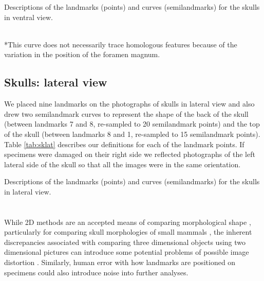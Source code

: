 \documentclass[12pt,a4paper]{article}
\begin{document}
\begin{table}[!htb] 
\caption[Skulls: ventral landmarks]
		{Descriptions of the landmarks (points) and curves (semilandmarks) for the skulls in ventral view.} 

\label{tab:skvent}
\\
*This curve does not necessarily trace homologous features because of the variation in the position of the foramen magnum.
\end{table}
	
\newpage
\subsection{Skulls: lateral view}
	We placed nine landmarks on the photographs of skulls in lateral view and also drew two semilandmark curves to represent the shape of the back of the skull (between landmarks 7 and 8, re-sampled to 20 semilandmark points) and the top of the skull (between landmarks 8 and 1, re-sampled to 15 semilandmark points). Table \ref{tab:sklat} describes our definitions for each of the landmark points.
	If specimens were damaged on their right side we reflected photographs of the left lateral side of the skull so that all the images were in the same orientation.

\begin{table}[!htb]
\caption[Skulls: lateral landmarks]
		{Descriptions of the landmarks (points) and curves (semilandmarks) for the skulls in lateral view.} 

\label{tab:sklat}
\end{table}
\section{}
	 
	While 2D methods are an accepted means of comparing morphological shape \citep[e.g.][]{Adams2004, Mitteroecker2009}, particularly for comparing skull morphologies of small mammals \citep[e.g.][]{Cardini2003, Panchetti2008, White2008, Barrow2008, Scalici2011}, the inherent discrepancies associated with comparing three dimensional objects using two dimensional pictures can introduce some potential problems of possible image distortion \citep{Arnqvist1998}. Similarly, human error with how landmarks are positioned on specimens could also introduce noise into further analyses. 
	
\end{document}
